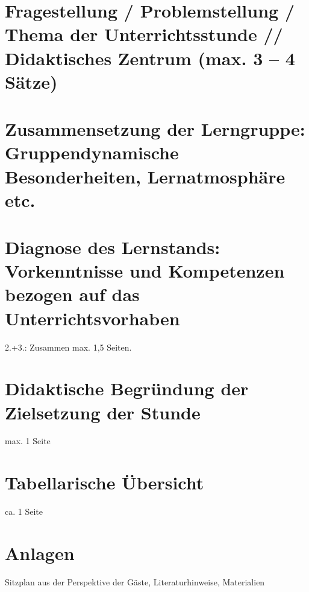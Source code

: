 \documentclass{kurzentwurf}
\begin{document}
\maketitle

\section{Fragestellung / Problemstellung / Thema der Unterrichtsstunde // Didaktisches Zentrum (max. 3 – 4 Sätze)}

\section{Zusammensetzung der Lerngruppe: Gruppendynamische Besonderheiten, Lernatmosphäre etc.}
\section{Diagnose des Lernstands: Vorkenntnisse und Kompetenzen bezogen auf das Unterrichtsvorhaben}

2.+3.: Zusammen max. 1,5 Seiten.

\section{Didaktische Begründung der Zielsetzung der Stunde}

max. 1 Seite

\section{Tabellarische Übersicht}

ca. 1 Seite

\section{Anlagen}
Sitzplan aus der Perspektive der Gäste, Literaturhinweise, Materialien


\pagebreak
\printbibliography[title={Literatur}]
\end{document}
